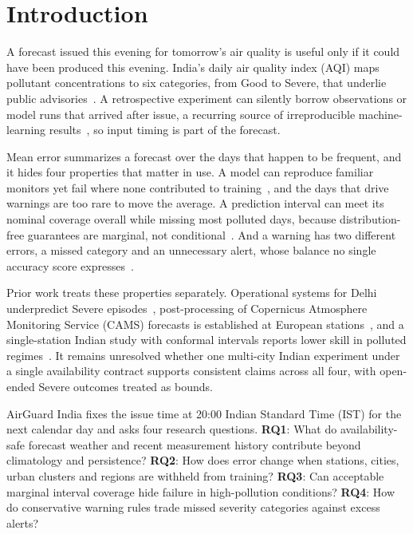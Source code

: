 \documentclass[conference,a4paper]{IEEEtran}
\begin{document}
\section{Introduction}
A forecast issued this evening for tomorrow's air quality is useful only if it could have been produced this evening. India's daily air quality index (AQI) maps pollutant concentrations to six categories, from Good to Severe, that underlie public advisories~\cite{cpcb2014}. A retrospective experiment can silently borrow observations or model runs that arrived after issue, a recurring source of irreproducible machine-learning results~\cite{kapoor2023}, so input timing is part of the forecast.

Mean error summarizes a forecast over the days that happen to be frequent, and it hides four properties that matter in use. A model can reproduce familiar monitors yet fail where none contributed to training~\cite{pant2019}, and the days that drive warnings are too rare to move the average. A prediction interval can meet its nominal coverage overall while missing most polluted days, because distribution-free guarantees are marginal, not conditional~\cite{foygelbarber2021}. And a warning has two different errors, a missed category and an unnecessary alert, whose balance no single accuracy score expresses~\cite{murphy1977}.

Prior work treats these properties separately. Operational systems for Delhi underpredict Severe episodes~\cite{jena2021,govardhan2024}, post-processing of Copernicus Atmosphere Monitoring Service (CAMS) forecasts is established at European stations~\cite{petetin2022,bertrand2023,riccio2024}, and a single-station Indian study with conformal intervals reports lower skill in polluted regimes~\cite{lawrence2026}. It remains unresolved whether one multi-city Indian experiment under a single availability contract supports consistent claims across all four, with open-ended Severe outcomes treated as bounds.

AirGuard India fixes the issue time at 20:00 Indian Standard Time (IST) for the next calendar day and asks four research questions.
\textbf{RQ1}: What do availability-safe forecast weather and recent measurement history contribute beyond climatology and persistence?
\textbf{RQ2}: How does error change when stations, cities, urban clusters and regions are withheld from training?
\textbf{RQ3}: Can acceptable marginal interval coverage hide failure in high-pollution conditions?
\textbf{RQ4}: How do conservative warning rules trade missed severity categories against excess alerts?
\end{document}
